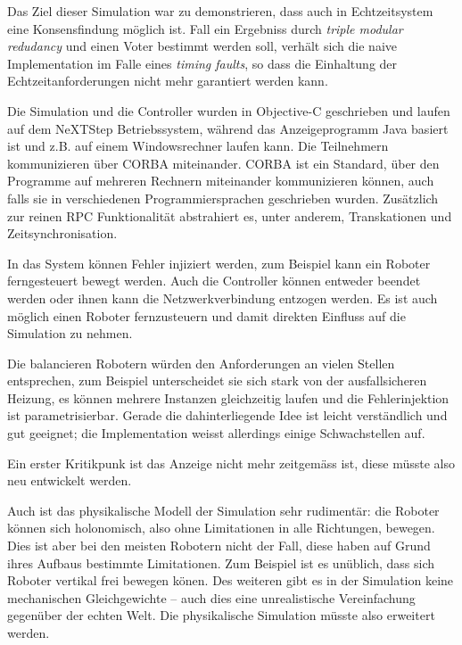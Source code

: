 Das Ziel dieser Simulation war zu demonstrieren, dass auch in Echtzeitsystem eine Konsensfindung m{\"{o}}glich
ist. Fall ein Ergebniss durch \textit{triple modular redudancy} und einen Voter bestimmt werden soll, 
verh{\"{a}}lt sich die naive Implementation im Falle eines \textit{timing faults}, so dass die
Einhaltung der Echtzeitanforderungen nicht mehr garantiert werden kann. 

Die Simulation und die Controller wurden in Objective-C geschrieben und laufen auf dem NeXTStep Betriebssystem, 
w{\"{a}}hrend das Anzeigeprogramm Java basiert ist und z.B. auf
einem Windowsrechner laufen kann. Die Teilnehmern kommunizieren {\"{u}}ber CORBA 
miteinander\cite{predictablecorba}. CORBA ist ein Standard, {\"{u}}ber den Programme auf
mehreren Rechnern miteinander kommunizieren k{\"{o}}nnen, auch falls sie in verschiedenen Programmiersprachen 
geschrieben wurden. Zus{\"{a}}tzlich zur reinen RPC Funktionalit{\"{a}}t abstrahiert es, unter anderem, 
Transkationen und Zeitsynchronisation.

In das System k{\"{o}}nnen Fehler injiziert werden, zum Beispiel kann ein Roboter ferngesteuert bewegt werden. Auch
die Controller k{\"{o}}nnen entweder beendet werden oder ihnen kann die Netzwerkverbindung entzogen werden. Es ist
auch m{\"{o}}glich einen Roboter fernzusteuern und damit direkten Einfluss auf die Simulation zu nehmen.

Die balancieren Robotern w{\"{u}}rden den Anforderungen an vielen Stellen entsprechen, zum Beispiel
unterscheidet sie sich stark von der ausfallsicheren Heizung, es k{\"{o}}nnen mehrere Instanzen
gleichzeitig laufen und die Fehlerinjektion ist parametrisierbar. Gerade die dahinterliegende Idee ist
leicht verst{\"{a}}ndlich und gut geeignet; die Implementation weisst allerdings einige Schwachstellen auf.

Ein erster Kritikpunk ist das Anzeige nicht mehr zeitgem{\"{a}}ss ist, diese m{\"{u}}sste also neu entwickelt werden.

Auch ist das physikalische Modell der Simulation sehr rudiment{\"{a}}r: die Roboter k{\"{o}}nnen sich
holonomisch, also ohne Limitationen in alle Richtungen, bewegen. Dies ist aber bei den meisten Robotern
nicht der Fall, diese haben auf Grund ihres Aufbaus bestimmte Limitationen. Zum Beispiel ist es un{\"{u}}blich, 
dass sich Roboter vertikal frei bewegen k{\"{o}}nen. Des weiteren gibt es in der Simulation keine mechanischen 
Gleichgewichte -- auch dies eine unrealistische Vereinfachung gegen{\"{u}}ber der echten Welt. Die
physikalische Simulation m{\"{u}}sste also erweitert werden.

